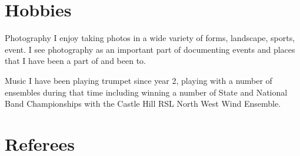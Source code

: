 \section{Hobbies}

\cvitem
{Photography}
{I enjoy taking photos in a wide variety of forms, landscape, sports, event. I see photography as an important part of documenting events and places that I have been a part of and been to.}

\cvitem
{Music}
{I have been playing trumpet since year 2, playing with a number of ensembles during that time including winning a number of State and National Band Championships with the Castle Hill RSL North West Wind Ensemble.}

\section{Referees}

